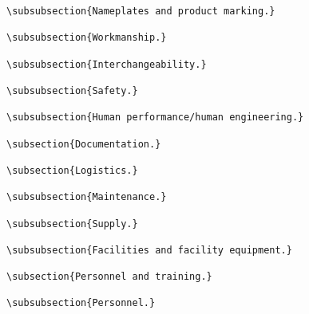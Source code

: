\begin{itemize}
\begin{small}
\begin{verbatim}
\subsubsection{Nameplates and product marking.}

\subsubsection{Workmanship.}

\subsubsection{Interchangeability.}

\subsubsection{Safety.}

\subsubsection{Human performance/human engineering.}

\subsection{Documentation.}

\subsection{Logistics.}

\subsubsection{Maintenance.}

\subsubsection{Supply.}

\subsubsection{Facilities and facility equipment.}

\subsection{Personnel and training.}

\subsubsection{Personnel.}


\end{verbatim}
\end{small}
\end{itemize}

